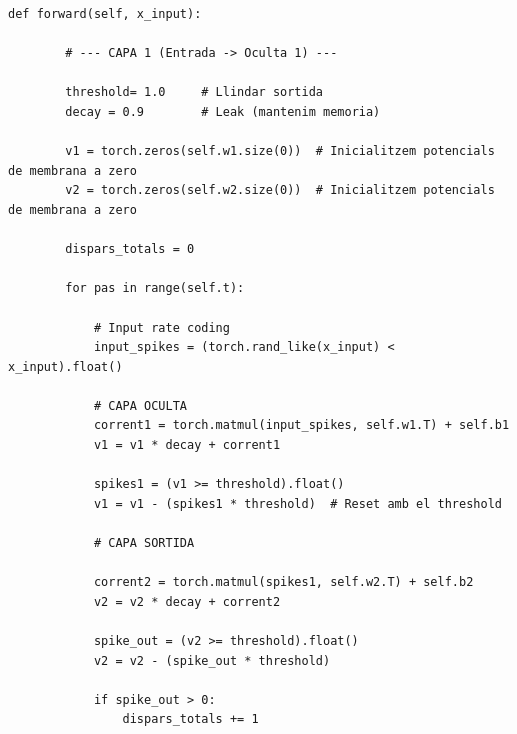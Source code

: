 \documentclass[a4paper,11pt, titlepage, twoside]{article}
\begin{document}
\newpage
\begin{lstlisting}[style=codi, caption={Fragment de la codificació per taxa de les entrades, paràmetres interns i sortides}, captionpos = b, label={lst:Codificacio_entrada}, firstnumber=74]
	def forward(self, x_input):
              
        # --- CAPA 1 (Entrada -> Oculta 1) ---

        threshold= 1.0     # Llindar sortida
        decay = 0.9        # Leak (mantenim memoria)

        v1 = torch.zeros(self.w1.size(0))  # Inicialitzem potencials de membrana a zero
        v2 = torch.zeros(self.w2.size(0))  # Inicialitzem potencials de membrana a zero
    
        dispars_totals = 0
        
        for pas in range(self.t):
            
            # Input rate coding
            input_spikes = (torch.rand_like(x_input) < x_input).float()

            # CAPA OCULTA
            corrent1 = torch.matmul(input_spikes, self.w1.T) + self.b1
            v1 = v1 * decay + corrent1
            
            spikes1 = (v1 >= threshold).float()
            v1 = v1 - (spikes1 * threshold)  # Reset amb el threshold
            
            # CAPA SORTIDA 
            
            corrent2 = torch.matmul(spikes1, self.w2.T) + self.b2
            v2 = v2 * decay + corrent2
            
            spike_out = (v2 >= threshold).float()
            v2 = v2 - (spike_out * threshold)
            
            if spike_out > 0:
                dispars_totals += 1
\end{lstlisting}
\end{document}
